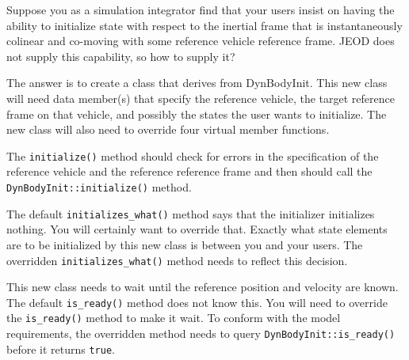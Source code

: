 Suppose you as a simulation integrator find that your users insist on
having the ability to initialize state with respect to the inertial frame that
is instantaneously colinear and co-moving with some reference vehicle
reference frame. JEOD does not supply this capability, so how to supply it?

The answer is to create a class that derives from DynBodyInit.
This new class will need data member(s) that
specify the reference vehicle, the target reference frame on that vehicle,
and possibly the states the user wants to initialize.
The new class will also need to override four virtual member functions.

The {\tt initialize()} method should check for errors in the specification
of the reference vehicle and the reference reference frame and then should
call the {\tt DynBodyInit::initialize()} method.

The default {\tt initializes\_what()} method says that the initializer
initializes nothing. You will certainly want to override that. Exactly
what state elements are to be initialized by this new class is between you
and your users. The overridden {\tt initializes\_what()} method needs to
reflect this decision.

This new class needs to wait until the reference position and velocity are
known. The default {\tt is\_ready()} method does not know this.
You will need to override the {\tt is\_ready()} method to make it wait.
To conform with the model requirements, the overridden method needs to
query {\tt DynBodyInit::is\_ready()} before it returns {\tt true}.

